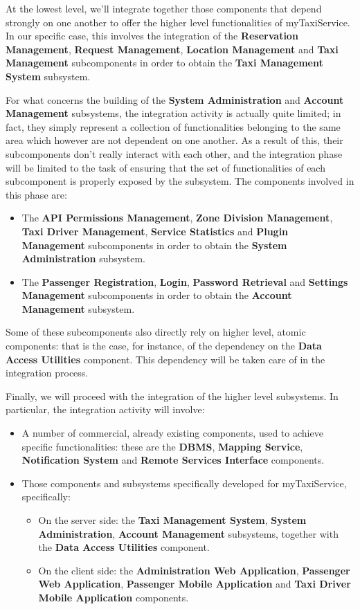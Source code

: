 At the lowest level, we'll integrate together those components that depend strongly on one another to offer the higher level functionalities of myTaxiService. In our specific case, this involves the integration of the \textbf{Reservation Management}, \textbf{Request Management}, \textbf{Location Management} and \textbf{Taxi Management} subcomponents in order to obtain the \textbf{Taxi Management System} subsystem. 

For what concerns the building of the \textbf{System Administration} and \textbf{Account Management} subsystems, the integration activity is actually quite limited; in fact, they simply represent a collection of functionalities belonging to the same area which however are not dependent on one another. As a result of this, their subcomponents don't really interact with each other, and the integration phase will be limited to the task of ensuring that the set of functionalities of each subcomponent is properly exposed by the subsystem. The components involved in this phase are:
\begin{itemize}
	\item The \textbf{API Permissions Management}, \textbf{Zone Division Management}, \textbf{Taxi Driver Management}, \textbf{Service Statistics} and \textbf{Plugin Management} subcomponents in order to obtain the \textbf{System Administration} subsystem.
	\item The \textbf{Passenger Registration}, \textbf{Login}, \textbf{Password Retrieval} and \textbf{Settings Management} subcomponents in order to obtain the \textbf{Account Management} subsystem.
\end{itemize}

Some of these subcomponents also directly rely on higher level, atomic components: that is the case, for instance, of the dependency on the \textbf{Data Access Utilities} component. This dependency will be taken care of in the integration process.

Finally, we will proceed with the integration of the higher level subsystems. In particular, the integration activity will involve:
\begin{itemize}
	\item A number of commercial, already existing components, used to achieve specific functionalities: these are the \textbf{DBMS}, \textbf{Mapping Service}, \textbf{Notification System} and \textbf{Remote Services Interface} components.
	\item Those components and subsystems specifically developed for myTaxiService, specifically:
		\begin{itemize}
		\item On the server side: the \textbf{Taxi Management System}, \textbf{System Administration}, \textbf{Account Management} subsystems, together with the \textbf{Data Access Utilities} component.
		\item On the client side: the \textbf{Administration Web Application}, \textbf{Passenger Web Application}, \textbf{Passenger Mobile Application} and \textbf{Taxi Driver Mobile Application} components.
		\end{itemize}
\end{itemize}
 
